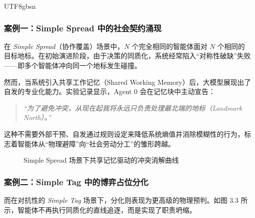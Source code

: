 \documentclass[11pt,a4paper]{article}
\begin{document}
\begin{CJK*}{UTF8}{gbsn}
\subsubsection{案例一：Simple Spread 中的社会契约涌现}
在 \textit{Simple Spread}（协作覆盖）场景中，$N$ 个完全相同的智能体面对 $N$ 个相同的目标地标。在初始演进阶段，由于决策的同质化，系统经常陷入“对称性破缺”失败——即多个智能体冲向同一个地标发生碰撞。

然而，当系统引入共享工作记忆（Shared Working Memory）后，大模型展现出了自发的专业化能力。实验记录显示，Agent 0 会在记忆块中主动宣告：
\begin{quote}
    \textit{“为了避免冲突，从现在起我将永远只负责处理最北端的地标（Landmark North）。”}
\end{quote}
这种不需要外部干预、自发通过规则设定来降低系统熵值并消除模糊性的行为，标志着智能体从“物理避障”向“社会劳动分工”的雏形跨越。

\begin{figure}[h!]
\centering
{}
\caption{Simple Spread 场景下共享记忆驱动的冲突消解曲线}
\end{figure}



\subsubsection{案例二：Simple Tag 中的博弈占位分化}
而在对抗性的 \textit{Simple Tag} 场景下，分化则表现为更高级的物理预判。如图 3.3 所示，智能体不再执行同质化的直线追逐，而是实现了职责坍缩。


\end{CJK*}
\end{document}

